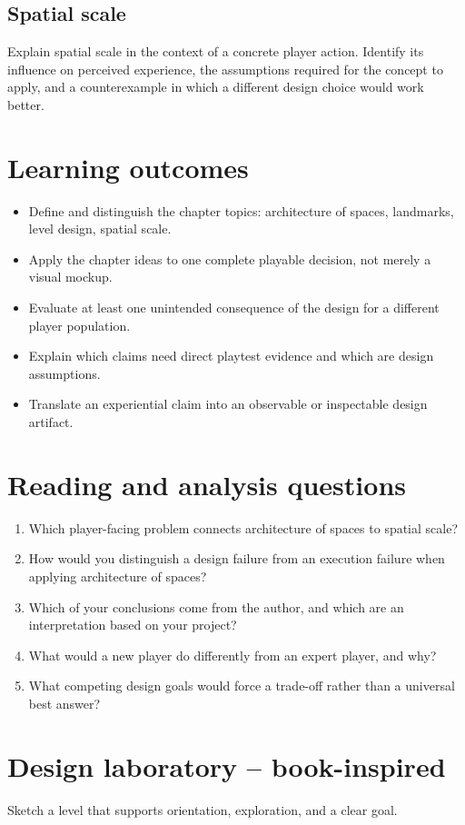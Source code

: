 \documentclass[11pt]{article}
\begin{document}
\subsection{Spatial scale}
Explain spatial scale in the context of a concrete player action. Identify its influence on perceived experience, the assumptions required for the concept to apply, and a counterexample in which a different design choice would work better.


\section{Learning outcomes}
\begin{itemize}
\item Define and distinguish the chapter topics: architecture of spaces, landmarks, level design, spatial scale.
\item Apply the chapter ideas to one complete playable decision, not merely a visual mockup.
\item Evaluate at least one unintended consequence of the design for a different player population.
\item Explain which claims need direct playtest evidence and which are design assumptions.
\item Translate an experiential claim into an observable or inspectable design artifact.
\end{itemize}

\section{Reading and analysis questions}
\begin{enumerate}
\item Which player-facing problem connects architecture of spaces to spatial scale?
\item How would you distinguish a design failure from an execution failure when applying architecture of spaces?
\item Which of your conclusions come from the author, and which are an interpretation based on your project?
\item What would a new player do differently from an expert player, and why?
\item What competing design goals would force a trade-off rather than a universal best answer?
\end{enumerate}

\section{Design laboratory -- book-inspired}
Sketch a level that supports orientation, exploration, and a clear goal.
\end{document}
